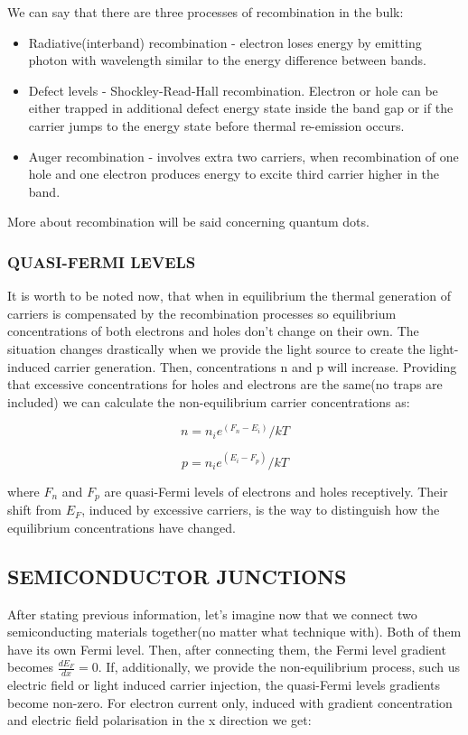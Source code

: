We can say that there are three processes of recombination in the bulk:
\begin{itemize}
\item Radiative(interband) recombination - electron loses energy by emitting photon with wavelength similar to the energy difference between bands.
\item Defect levels - Shockley-Read-Hall recombination. Electron or hole can be either trapped in additional defect energy state inside the band gap or if the carrier jumps to the energy state before thermal re-emission occurs. 
\item Auger recombination - involves extra two carriers, when recombination of one hole and one electron produces energy to excite third carrier higher in the band. 
\end{itemize}

More about recombination will be said   concerning quantum dots.\cite{popko} \cite{pv}

\subsubsection{QUASI-FERMI LEVELS}
It is worth to be noted now, that when in equilibrium the thermal generation of carriers is compensated by the recombination processes so equilibrium concentrations of both electrons and holes don't change on their own. The situation changes drastically when we provide the light source to create the light-induced carrier generation. Then, concentrations n and p will increase. Providing that excessive concentrations for holes and electrons are the same(no traps are included) we can calculate the non-equilibrium carrier concentrations as:

\begin{equation}
n = n_ie^(F_n-E_i)/kT
\end{equation}

\begin{equation}
p = n_ie^(E_i-F_p)/kT
\end{equation}

where $F_n$ and $F_p$ are quasi-Fermi levels of electrons and holes receptively. Their shift from $E_F$, induced by excessive carriers, is the way to distinguish how the equilibrium concentrations have changed. 
\subsection{SEMICONDUCTOR JUNCTIONS}

After stating previous information, let's imagine now that we connect two semiconducting materials together(no matter what technique with). Both of them have its own Fermi level. Then, after connecting them, the Fermi level gradient becomes $\frac{dE_F}{dx}=0$. If, additionally, we provide the non-equilibrium process, such us electric field or light induced carrier injection, the quasi-Fermi levels gradients become non-zero. For electron current only, induced with gradient concentration and electric field polarisation in the x direction we get: 

